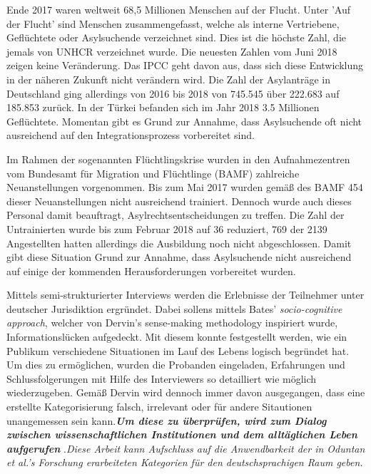 Ende 2017 waren weltweit 68,5 Millionen Menschen auf der Flucht. Unter 'Auf der Flucht'  sind Menschen zusammengefasst, welche als interne Vertriebene, Gefl\"uchtete oder Asylsuchende verzeichnet sind. Dies ist die h\"ochste Zahl, die jemals von UNHCR verzeichnet wurde.\cite{uno2018flucht}
Die neuesten Zahlen vom Juni 2018 zeigen keine Ver\"anderung. \cite{uno2018flucht}
Das IPCC geht davon aus, dass sich diese Entwicklung in der n\"aheren Zukunft nicht ver\"andern wird. \cite{sr15ipcc}\newline
Die Zahl der Asylantr\"age in Deutschland ging allerdings von 2016 bis 2018 von 745.545 \"uber 222.683 auf 185.853 zur\"uck. \cite{statistica2019asyl} In der T\"urkei befanden sich im Jahr 2018 3.5 Millionen Gefl\"uchtete.\newline
\newline
Momentan gibt es Grund zur Annahme, dass Asylsuchende oft nicht ausreichend auf den Integrationsprozess vorbereitet sind. \cite{oduntan2017information} \cite{gillespie2016mapping}\newline

Im Rahmen der sogenannten Fl\"uchtlingskrise wurden in den Aufnahmezentren vom {Bundesamt f\"ur Migration und Fl\"uchtlinge} (BAMF) zahlreiche Neuanstellungen vorgenommen. Bis zum Mai 2017 wurden gem\"a\ss{} des BAMF 454 dieser Neuanstellungen nicht ausreichend trainiert. Dennoch wurde auch dieses Personal damit beauftragt, Asylrechtsentscheidungen zu treffen.\newline
Die Zahl der Untrainierten wurde bis zum Februar 2018 auf 36 reduziert, 769 der 2139 Angestellten hatten allerdings die Ausbildung noch nicht abgeschlossen.\newline
Damit gibt diese Situation Grund zur Annahme, dass Asylsuchende nicht ausreichend auf einige der kommenden Herausforderungen vorbereitet wurden. \cite{asylum2018bamf}\newline

Mittels semi-strukturierter Interviews werden die Erlebnisse der Teilnehmer unter deutscher Jurisdiktion ergr\"undet. Dabei sollens mittels Bates' \textit{socio-cognitive approach}\cite{bates2005introduction}, welcher von Dervin's sense-making methodology\cite{dervin2003sense} inspiriert wurde, Informationsl\"ucken aufgedeckt.\newline
Mit diesem konnte festgestellt werden, wie ein Publikum verschiedene Situationen im Lauf des Lebens logisch begr\"undet hat. Um dies zu erm\"oglichen, wurden die Probanden eingeladen, Erfahrungen und Schlussfolgerungen mit Hilfe des Interviewers so detailliert wie m\"oglich wiederzugeben.\newline
Gem\"a\ss{} Dervin wird dennoch immer davon ausgegangen, dass eine erstellte Kategorisierung falsch, irrelevant oder f\"ur andere Sitautionen unangemessen sein kann.\textit{\textbf{Um diese zu \"uberpr\"ufen, wird zum Dialog zwischen wissenschaftlichen Institutionen und dem allt\"aglichen Leben aufgerufen}} .\textit{Diese Arbeit kann Aufschluss auf die Anwendbarkeit der in Oduntan et al.'s Forschung erarbeiteten Kategorien f\"ur den deutschsprachigen Raum geben.}\newline

